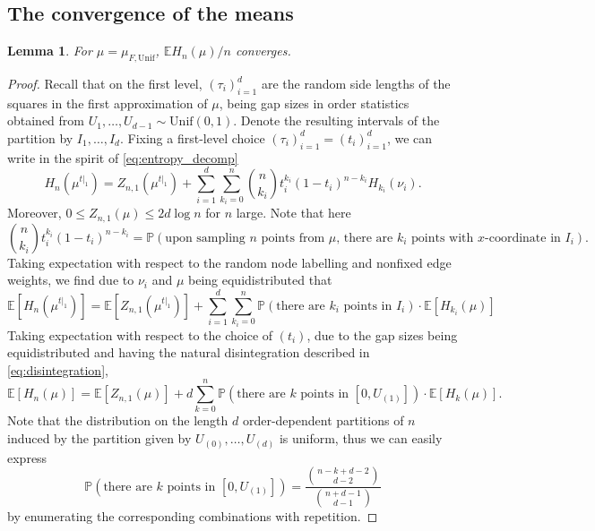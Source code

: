 \documentclass[11pt]{article}
\newcommand{\PP}{\mathbb{P}}
\newcommand{\EE}{\mathbb{E}}
\newcommand{\Unif}{\mathrm{Unif}}
\newtheorem{lemma}[theorem]{Lemma}
\theoremstyle{definition}
\begin{document}
\subsection{The convergence of the means}

\begin{lemma}\label{lemma:random_aut_conv_means}
    For $\mu=\mu_{F,\Unif}$, $\EE H_n(\mu)/n$ converges.
\end{lemma}

\begin{proof}
    Recall that on the first level, $(\tau_i)_{i=1}^{d}$ are the random side lengths of the squares in the first approximation of $\mu$, being gap sizes in order statistics obtained from $U_1, \dots, U_{d-1}\sim \Unif(0, 1)$. Denote the resulting intervals of the partition by $I_1, \dots, I_d$. Fixing a first-level choice $(\tau_i)_{i=1}^{d} = (t_i)_{i=1}^{d}$, we can write in the spirit of \eqref{eq:entropy_decomp}
    \begin{equation}\label{eq:entropy_decomp2}
    H_n(\mu^{t|_1}) = Z_{n, 1}(\mu^{t|_1}) + \sum_{i=1}^{d} \sum_{k_i=0}^{n}\binom{n}{k_i} t_i^{k_i}(1-t_i)^{n-k_i}H_{k_i}(\nu_i).
    \end{equation}
    Moreover, $0\leq Z_{n, 1}(\mu) \leq 2d\log n$ for $n$ large.
    Note that here
    $$\binom{n}{k_i} t_i^{k_i}(1-t_i)^{n-k_i}=\PP(\text{upon sampling $n$ points from $\mu$, there are $k_i$ points with $x$-coordinate in $I_i$}).$$
    Taking expectation with respect to the random node labelling and nonfixed edge weights, we find due to $\nu_i$ and $\mu$ being equidistributed that
    \begin{equation}\label{eq:entropy_decomp2_expectation}
    \EE[H_n(\mu^{t|_1})]=\EE [Z_{n, 1}(\mu^{t|_1})] + \sum_{i=1}^{d}\sum_{k_i=0}^{n}\PP(\text{there are $k_i$ points in $I_i$})\cdot\EE[H_{k_i}(\mu)]
    \end{equation}
    Taking expectation with respect to the choice of $(t_i)$, due to the gap sizes being equidistributed and having the natural disintegration described in \eqref{eq:disintegration},
    $$\EE [H_n(\mu)] = \EE [Z_{n, 1}(\mu)] + d\sum_{k=0}^{n}\PP(\text{there are $k$ points in $[0, U_{(1)}]$})\cdot\EE [H_k(\mu)].$$
    Note that the distribution on the length $d$ order-dependent partitions of $n$ induced by the partition given by $U_{(0)}, \dots, U_{(d)}$ is uniform, thus we can easily express 
    \begin{equation}\label{eq:point_distribution}
    \PP(\text{there are $k$ points in $[0, U_{(1)}]$})=\frac{\binom{n-k+d-2}{d-2}}{\binom{n+d-1}{d-1}}
    \end{equation}
    by enumerating the corresponding combinations with repetition. 
    

\end{proof}
\end{document}
